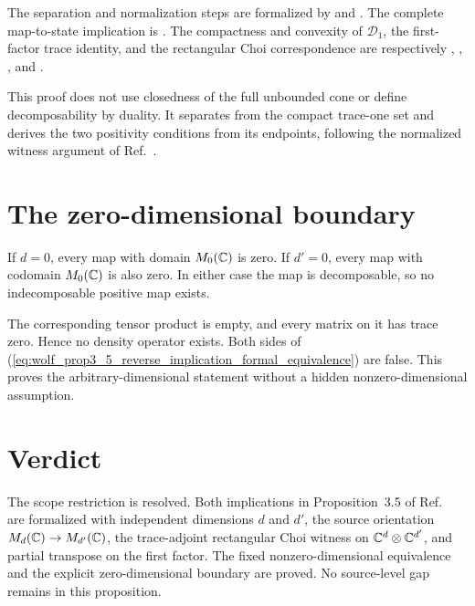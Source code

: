 \documentclass{article}
\begin{document}
The separation and normalization steps are formalized by
and
.
The complete map-to-state implication is
.
The compactness and convexity of $\mathcal D_1$, the first-factor trace
identity, and the rectangular Choi correspondence are respectively
,
,
, and
.

This proof does not use closedness of the full unbounded cone or define
decomposability by duality. It separates from the compact trace-one set and
derives the two positivity conditions from its endpoints, following the
normalized witness argument of
Ref.~\cite{LewensteinKrausCiracHorodecki2000}.

\section{The zero-dimensional boundary}

If $d=0$, every map with domain $M_{0}(\mathbb{C})$ is zero. If $d'=0$, every map with
codomain $M_{0}(\mathbb{C})$ is also zero. In either case the map is decomposable, so no
indecomposable positive map exists.

The corresponding tensor product is empty, and every matrix on it has trace
zero. Hence no density operator exists. Both sides of
(\ref{eq:wolf_prop3_5_reverse_implication_formal_equivalence}) are false.
This proves the arbitrary-dimensional statement without a hidden
nonzero-dimensional assumption.

\section{Verdict}

The scope restriction is resolved. Both implications in Proposition~3.5 of
Ref.~\cite{Wolf2012Quantum} are formalized with independent dimensions $d$
and $d'$, the source orientation $M_{d}(\mathbb{C})\to M_{d'}(\mathbb{C})$, the trace-adjoint
rectangular Choi witness on $\mathbb{C}^d\otimes\mathbb{C}^{d'}$, and partial transpose on the
first factor. The fixed nonzero-dimensional equivalence and the explicit
zero-dimensional boundary are proved. No source-level gap remains in this
proposition.



\end{document}
